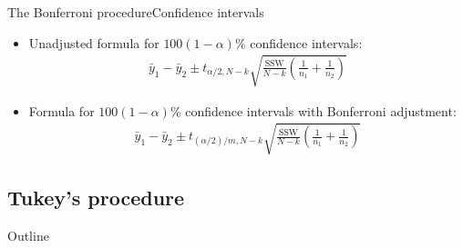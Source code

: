 \documentclass[xcolor=dvipsnames]{beamer}
\begin{document}
\begin{frame}{The Bonferroni procedure}{Confidence intervals}
	\begin{itemize}
		\item Unadjusted formula for $100(1-\alpha)\%$ confidence intervals:
		\begin{gather*}
		\bar{y}_1 - \bar{y}_2 \pm t_{\alpha / 2, N - k}{\sqrt{\frac{\text{SSW}}{N-k} \left(\frac{1}{n_1}+\frac{1}{n_2}\right)}}
		\end{gather*}
		\item Formula for $100(1-\alpha)\%$ confidence intervals with Bonferroni adjustment:
		\begin{gather*}
		\bar{y}_1 - \bar{y}_2 \pm t_{(\alpha / 2) / m, N - k}{\sqrt{\frac{\text{SSW}}{N-k} \left(\frac{1}{n_1}+\frac{1}{n_2}\right)}}
		\end{gather*}
	\end{itemize}
\end{frame}

\subsection{Tukey’s procedure}
\begin{frame}{Outline}
	\tableofcontents[currentsection,subsectionstyle=show/shaded/hide]
\end{frame}
\end{document}
